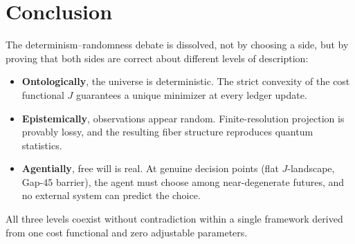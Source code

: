 \documentclass[12pt,a4paper]{article}
\theoremstyle{definition}
\theoremstyle{remark}
\begin{document}
\section{Conclusion}
\label{sec:conclusion}

The determinism--randomness debate is dissolved, not by choosing a side,
but by proving that both sides are correct about different levels of
description:
\begin{itemize}
  \item \textbf{Ontologically}, the universe is deterministic.  The strict
  convexity of the cost functional $J$ guarantees a unique minimizer at
  every ledger update.

  \item \textbf{Epistemically}, observations appear random.  Finite-resolution
  projection is provably lossy, and the resulting fiber structure
  reproduces quantum statistics.

  \item \textbf{Agentially}, free will is real.  At genuine decision points
  (flat $J$-landscape, Gap-45 barrier), the agent must choose among
  near-degenerate futures, and no external system can predict the choice.
\end{itemize}

All three levels coexist without contradiction within a single framework
derived from one cost functional and zero adjustable parameters.
\end{document}

